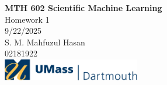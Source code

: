 \documentclass[11pt]{article} %
\begin{document}
    \begin{titlepage}
    \centering
    \vspace*{\fill}
    \LARGE{\textbf{MTH 602 Scientific Machine Learning}}\\
    \vspace*{0.3cm}
    \Large{Homework 1}\\
     \vspace*{0.3cm}
    9/22/2025\\
         \vspace*{2cm}
   S. M. Mahfuzul Hasan\\
        \vspace*{0.3cm}
   02181922\\
        \vspace*{2.5cm}
   \includegraphics[width=6cm]{umassd-standard-2color-logo-LG-1}
    \vspace*{\fill}
    \end{titlepage}
\end{document}
